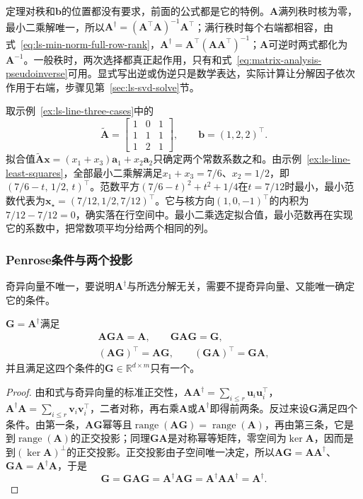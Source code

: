 定理对秩和$\bm b$的位置都没有要求，前面的公式都是它的特例。$\bm A$满列秩时核为零，最小二乘解唯一，所以$\bm A^\dagger=(\bm A^\top\bm A)^{-1}\bm A^\top$；满行秩时每个右端都相容，由式~\eqref{eq:ls-min-norm-full-row-rank}，$\bm A^\dagger=\bm A^\top(\bm A\bm A^\top)^{-1}$；$\bm A$可逆时两式都化为$\bm A^{-1}$。一般秩时，两次选择都真正起作用，只有和式~\eqref{eq:matrix-analysis-pseudoinverse}可用。显式写出逆或伪逆只是数学表达，实际计算让分解因子依次作用于右端，步骤见第~\ref{sec:ls-svd-solve}节。

\begin{example}[复制常数列后的最小范数拟合]
\label{ex:ls-line-min-norm}
取示例~\ref{ex:ls-line-three-cases}中的
\[
 \widetilde{\bm A}=\begin{bmatrix}1&0&1\\1&1&1\\1&2&1\end{bmatrix},\qquad \bm b=(1,2,2)^\top .
\]
拟合值$\widetilde{\bm A}\bm x=(x_1+x_3)\bm a_1+x_2\bm a_2$只确定两个常数系数之和。由示例~\ref{ex:ls-line-least-squares}，全部最小二乘解满足$x_1+x_3=7/6$、$x_2=1/2$，即$(7/6-t,\,1/2,\,t)^\top$。范数平方$(7/6-t)^2+t^2+1/4$在$t=7/12$时最小，最小范数代表为$\bm x_\star=(7/12,1/2,7/12)^\top$。它与核方向$(1,0,-1)^\top$的内积为$7/12-7/12=0$，确实落在行空间中。最小二乘选定拟合值，最小范数再在实现它的系数中，把常数项平均分给两个相同的列。
\end{example}

\subsubsection{Penrose条件与两个投影}
\label{sec:ls-penrose-conditions}

奇异向量不唯一，要说明$\bm A^\dagger$与所选分解无关，需要不提奇异向量、又能唯一确定它的条件。

\begin{theorem}[Penrose条件]
\label{thm:ls-penrose-conditions}
$\bm G=\bm A^\dagger$满足
\[
\begin{gathered}
\bm A\bm G\bm A=\bm A,\qquad
\bm G\bm A\bm G=\bm G,\\
(\bm A\bm G)^\top=\bm A\bm G,\qquad
(\bm G\bm A)^\top=\bm G\bm A ,
\end{gathered}
\]
并且满足这四个条件的$\bm G\in\mathbb R^{d\times m}$只有一个。
\end{theorem}
\begin{proof}
由和式与奇异向量的标准正交性，$\bm A\bm A^\dagger=\sum_{i\leq r}\bm u_i\bm u_i^\top$，$\bm A^\dagger\bm A=\sum_{i\leq r}\bm v_i\bm v_i^\top$，二者对称，再右乘$\bm A$或$\bm A^\dagger$即得前两条。反过来设$\bm G$满足四个条件。由第一条，$\bm A\bm G$幂等且$\operatorname{range}(\bm A\bm G)=\operatorname{range}(\bm A)$，再由第三条，它是到$\operatorname{range}(\bm A)$的正交投影；同理$\bm G\bm A$是对称幂等矩阵，零空间为$\ker\bm A$，因而是到$(\ker\bm A)^\perp$的正交投影。正交投影由子空间唯一决定，所以$\bm A\bm G=\bm A\bm A^\dagger$、$\bm G\bm A=\bm A^\dagger\bm A$，于是
\[
 \bm G=\bm G\bm A\bm G=\bm A^\dagger\bm A\bm G=\bm A^\dagger\bm A\bm A^\dagger=\bm A^\dagger .
\]
\end{proof}

